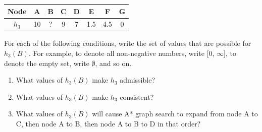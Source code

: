 \documentclass[11pt]{article}
\begin{document}
\begin{enumerate}
\begin{center}
\begin{tabular}{|c|c|c|c|c|c|c|c|}
\hline
Node & A & B & C & D & E & F & G \\
\hline
$h_3$& 10 & ?  & 9 & 7 & 1.5 & 4.5& 0 \\
\hline
\end{tabular}
\end{center}

For each of the following conditions, write the set of values that are
possible for $h_3(B)$.  For example, to denote all non-negative
numbers, write [0, $\infty$], to denote the empty set, write
$\emptyset$, and so on.

\begin{enumerate}

\item What values of $h_3(B)$ make $h_3$ admissible?

\item What values of $h_3(B)$ make $h_3$ consistent?

\item What values of $h_3(B)$ will cause A* graph search to expand
  from node A to C, then node A to B, then node A to B to D in that
  order?

\end{enumerate}

\end{enumerate}
\end{document}

